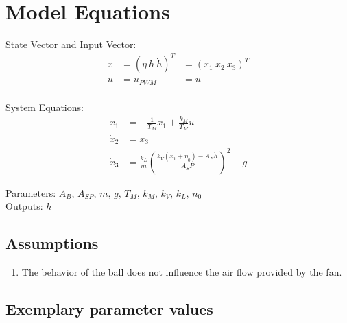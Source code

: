 \documentclass[10pt,a4paper]{article}
\begin{document}
	
	\section{Model Equations} %
	
	State Vector and Input Vector:
	\begin{align*}
	    \underline{x} &= (\eta \ h \ \dot{h})^T &= (x_1 \ x_2 \ x_3)^T \\
		\underline{u} &= u_{PWM} &= u \\
	\end{align*}
	
	\noindent System Equations:			
	\begin{subequations}
	\begin{align}
		\dot{x}_1 &= -\frac{1}{T_M}x_1 + \frac{k_M}{T_M}u\\
		\dot{x}_2 &= x_3 \\
		\dot{x}_3 &= \frac{k_L}{m}\left(\frac{k_V(x_1+\eta_0) - A_B\dot{h}}{A_SP}\right)^2 -g
	\end{align}
	\end{subequations}

	\noindent
	Parameters: $A_B, \, A_{SP}, \, m, \, g, \, T_M, \, k_M, \, k_V, \, k_L, \, n_0$ %
	\\
	Outputs: $h$ \\ 
	
	
	\subsection{Assumptions} %
		\begin{enumerate} %
			\item The behavior of the ball does not influence the air flow provided by the fan. 
		\end{enumerate}
	
	
	\subsection{Exemplary parameter values}
	
\end{document}
